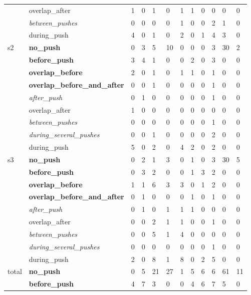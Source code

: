 \begin{screenonly}
\begin{table*}[h]
\begin{tabular*}{\hsize}{@{\extracolsep{\fill}}llllllllllll}
    & overlap\_after & 1 & 0 & 1 & 0 & 1 & 1 & 0 & 0 & 0 & 0\\
    & \textsl{between\_pushes} & 0 & 0 & 0 & 0 & 1 & 0 & 0 & 2 & 1 & 0\\
    & during\_push & 4 & 0 & 1 & 0 & 2 & 0 & 1 & 4 & 3 & 0\\
    \midrule
    \multirow{8}{*}{s2} & \textbf{no\_push} & 0 & 3 & 5 & 10 & 0 & 0 & 0 & 3 & 30 & 2\\
    & \textbf{before\_push} & 3 & 4 & 1 & 0 & 0 & 2 & 0 & 3 & 0 & 0\\
    & \textbf{overlap\_before} & 2 & 0 & 1 & 0 & 1 & 1 & 0 & 1 & 0 & 0\\
    & \textbf{overlap\_before\_and\_after} & 0 & 0 & 1 & 0 & 0 & 0 & 0 & 1 & 0 & 0\\
    & \textsl{after\_push} & 0 & 1 & 0 & 0 & 0 & 0 & 0 & 1 & 0 & 0\\
    & overlap\_after & 1 & 0 & 0 & 0 & 0 & 0 & 0 & 0 & 0 & 0\\
    & \textsl{between\_pushes} & 0 & 0 & 0 & 0 & 0 & 0 & 0 & 1 & 0 & 0\\
    & \textsl{during\_several\_pushes} & 0 & 0 & 1 & 0 & 0 & 0 & 0 & 2 & 0 & 0\\
    & during\_push & 5 & 0 & 2 & 0 & 4 & 2 & 0 & 2 & 0 & 0\\
    \midrule
    \multirow{8}{*}{s3} & \textbf{no\_push} & 0 & 2 & 1 & 3 & 0 & 1 & 0 & 3 & 30 & 5\\
    & \textbf{before\_push} & 0 & 3 & 2 & 0 & 0 & 1 & 3 & 2 & 0 & 0\\
    & \textbf{overlap\_before} & 1 & 1 & 6 & 3 & 3 & 0 & 1 & 2 & 0 & 0\\
    & \textbf{overlap\_before\_and\_after} & 0 & 1 & 0 & 0 & 0 & 1 & 0 & 1 & 0 & 0\\
    & \textsl{after\_push} & 0 & 1 & 0 & 1 & 1 & 1 & 0 & 0 & 0 & 0\\
    & overlap\_after & 0 & 0 & 2 & 1 & 1 & 0 & 0 & 1 & 0 & 0\\
    & \textsl{between\_pushes} & 0 & 0 & 5 & 1 & 4 & 0 & 0 & 0 & 0 & 0\\
    & \textsl{during\_several\_pushes} & 0 & 0 & 0 & 0 & 0 & 0 & 0 & 1 & 0 & 0\\
    & during\_push & 2 & 0 & 8 & 1 & 8 & 0 & 2 & 5 & 0 & 0\\
    \midrule
    \multirow{8}{*}{total} & \textbf{no\_push} & 0 & 5 & 21 & 27 & 1 & 5 & 6 & 6 & 61 & 11\\
    & \textbf{before\_push} & 4 & 7 & 3 & 0 & 0 & 4 & 6 & 7 & 5 & 0\\

\end{tabular*}
\end{table*}
\end{screenonly}
